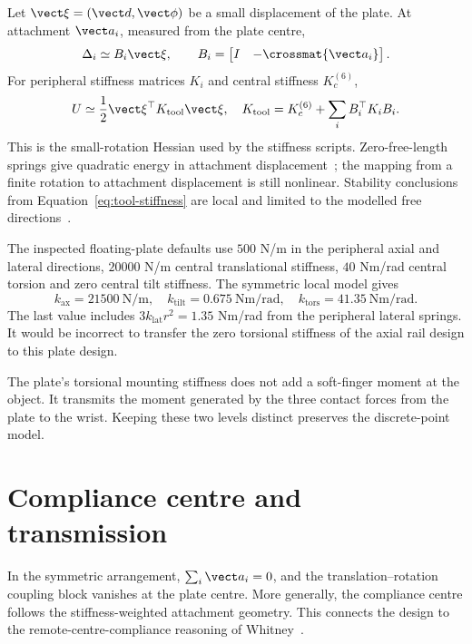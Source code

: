 Let $\vect\xi=(\vect d,\vect\phi)$ be a small displacement of the plate. At attachment $\vect a_i$, measured from the plate centre,
\begin{equation}
\Delta_i\simeq B_i\vect\xi,\qquad
B_i=\begin{bmatrix}I&-\crossmat{\vect a_i}\end{bmatrix}.
\end{equation}
For peripheral stiffness matrices $K_i$ and central stiffness $K_c^{(6)}$,
\begin{equation}
U\simeq\frac12\vect\xi^\top K_{\mathrm{tool}}\vect\xi,
\quad
K_{\mathrm{tool}}=K_c^{(6)}+\sum_i B_i^\top K_iB_i.
\label{eq:tool-stiffness}
\end{equation}
This is the small-rotation Hessian used by the stiffness scripts. Zero-free-length springs give quadratic energy in attachment displacement~\cite{herder2001}; the mapping from a finite rotation to attachment displacement is still nonlinear. Stability conclusions from Equation~\eqref{eq:tool-stiffness} are local and limited to the modelled free directions~\cite{guest2006}.

The inspected floating-plate defaults use $500$ N/m in the peripheral axial and lateral directions, $20000$ N/m central translational stiffness, $40$ Nm/rad central torsion and zero central tilt stiffness. The symmetric local model gives
\begin{equation}
k_{\mathrm{ax}}=21500\ \mathrm{N/m},\quad
k_{\mathrm{tilt}}=0.675\ \mathrm{Nm/rad},\quad
k_{\mathrm{tors}}=41.35\ \mathrm{Nm/rad}.
\end{equation}
The last value includes $3k_{\mathrm{lat}}r^2=1.35$ Nm/rad from the peripheral lateral springs. It would be incorrect to transfer the zero torsional stiffness of the axial rail design to this plate design.

The plate's torsional mounting stiffness does not add a soft-finger moment at the object. It transmits the moment generated by the three contact forces from the plate to the wrist. Keeping these two levels distinct preserves the discrete-point model.

\section{Compliance centre and transmission}

In the symmetric arrangement, $\sum_i\vect a_i=0$, and the translation--rotation coupling block vanishes at the plate centre. More generally, the compliance centre follows the stiffness-weighted attachment geometry. This connects the design to the remote-centre-compliance reasoning of Whitney~\cite{whitney1982}.

